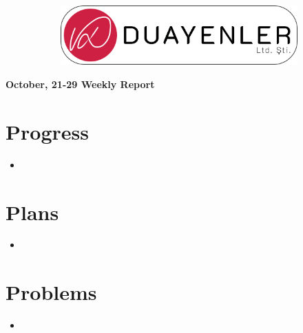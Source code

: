 \documentclass[a4paper,12pt]{article}
\begin{document}
	
\begin{figure}
	\vspace*{-.7cm}
	\centering
	\begin{figure}[H]
		\center
		\setlength{\unitlength}{\textwidth} 
		\includegraphics[width=0.9\unitlength]{../../../Documents/logos/logo3-with-stroke}
	\end{figure}
\end{figure}
\vspace*{-1.7cm}
\begin{center}
	\Large\textbf{October, 21-29 Weekly Report}
	\end{center}



\section{Progress}

\begin{itemize}
	
	\item
	
\end{itemize}


\section{Plans}

\begin{itemize}
	
	\item
	
\end{itemize}


\section{Problems}	

\begin{itemize}
	
	\item \lipsum[1-3]
	
\end{itemize}


\end{document}
